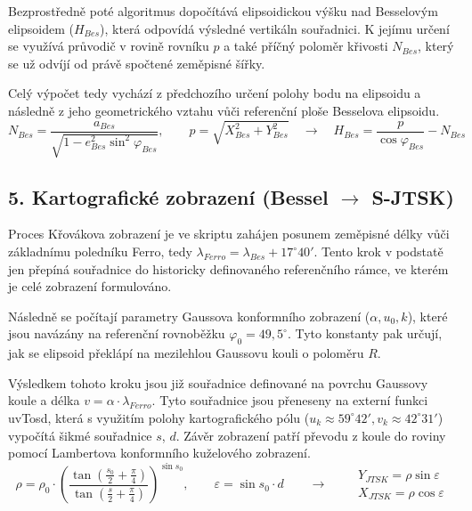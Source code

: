 Bezprostředně poté algoritmus dopočítává elipsoidickou výšku nad Besselovým elipsoidem ($H_{Bes}$), která odpovídá výsledné vertikáln souřadnici. K jejímu určení se využívá průvodič v rovině rovníku $p$ a také příčný poloměr křivosti $N_{Bes}$, který se už odvíjí od právě spočtené zeměpisné šířky.

Celý výpočet tedy vychází z předchozího určení polohy bodu na elipsoidu a následně z jeho geometrického vztahu vůči referenční ploše Besselova elipsoidu.
\begin{equation*}
N_{Bes} = \frac{a_{Bes}}{\sqrt{1 - e^2_{Bes}\sin^2\varphi_{Bes}}}, \qquad p = \sqrt{X_{Bes}^2 + Y_{Bes}^2} \quad \rightarrow \quad H_{Bes} = \frac{p}{\cos \varphi_{Bes}} - N_{Bes}
\end{equation*}

\subsection*{5. Kartografické zobrazení (Bessel $\rightarrow$ S-JTSK)}
Proces Křovákova zobrazení je ve skriptu zahájen posunem zeměpisné délky vůči základnímu poledníku Ferro, tedy $\lambda_{Ferro} = \lambda_{Bes} + 17^\circ 40'$. Tento krok v podstatě jen přepíná souřadnice do historicky definovaného referenčního rámce, ve kterém je celé zobrazení formulováno.

Následně se počítají parametry Gaussova konformního zobrazení ($\alpha, u_0, k$), které jsou navázány na referenční rovnoběžku $\varphi_0 = 49{,}5^\circ$. Tyto konstanty pak určují, jak se elipsoid překlápí na mezilehlou Gaussovu kouli o poloměru $R$.

Výsledkem tohoto kroku jsou již souřadnice definované na povrchu Gaussovy koule a délka $v = \alpha \cdot \lambda_{Ferro}$. Tyto souřadnice jsou přeneseny na externí funkci uvTosd, která s využitím polohy kartografického pólu ($u_k \approx 59^\circ 42', v_k \approx 42^\circ 31'$) vypočítá šikmé souřadnice $s$, $d$.
Závěr zobrazení patří převodu z koule do roviny pomocí Lambertova konformního kuželového zobrazení.
\begin{equation*}
\rho = \rho_0 \cdot \left( \frac{\operatorname{tan}(\frac{s_0}{2} + \frac{\pi}{4})}{\operatorname{tan}(\frac{s}{2} + \frac{\pi}{4})} \right)^{\sin s_0}, \qquad \varepsilon = \sin s_0 \cdot d \qquad \rightarrow \qquad \begin{matrix} Y_{JTSK} = \rho \sin \varepsilon \\ X_{JTSK} = \rho \cos \varepsilon \end{matrix}
\end{equation*}

